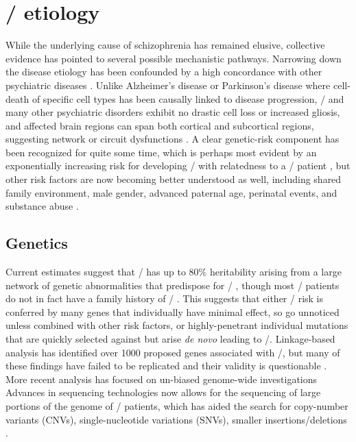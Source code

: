 \section{\Scz/ etiology}\label{sec:intro:scz:etiology}
While the underlying cause of schizophrenia has remained elusive, collective evidence has pointed to several possible mechanistic pathways.
Narrowing down the disease etiology has been confounded by a high concordance with other psychiatric diseases \citep{Kessler2005}.
Unlike Alzheimer’s disease or Parkinson’s disease where cell-death of specific cell types has been causally linked to disease progression, \scz/ and many other psychiatric disorders exhibit no drastic cell loss or increased gliosis, and affected brain regions can span both cortical and subcortical regions, suggesting network or circuit dysfunctions \citep{Uhlhaas2012, Lewis2002}.
A clear genetic-risk component has been recognized for quite some time, which is perhaps most evident by an exponentially increasing risk for developing \scz/ with relatedness to a \scz/ patient \citep{Rodriguez-Murillo2012}, but other risk factors are now becoming better understood as well, including shared family environment, male gender, advanced paternal age, perinatal events, and substance abuse \citep{Lichtenstein2009}.

\subsection{Genetics}
Current estimates suggest that \scz/ has up to 80\% heritability arising from a large network of genetic abnormalities that predispose for \scz/ \citep{Ripke2011}, though most \scz/ patients do not in fact have a family history of \scz/ \citep{Rodriguez-Murillo2012}.
This suggests that either \scz/ risk is conferred by many genes that individually have minimal effect, so go unnoticed unless combined with other risk factors, or highly-penetrant individual mutations that are quickly selected against but arise \emph{de novo} leading to \scz/.
Linkage-based analysis has identified over 1000 proposed genes associated with \scz/, but many of these findings have failed to be replicated and their validity is questionable \citep[\url{http://www.szgene.org}, ][]{Allen2008}.
More recent analysis has focused on un-biased genome-wide investigations
Advances in sequencing technologies now allows for the sequencing of large portions of the genome of \scz/ patients, which has aided the search for copy-number variants (CNVs), single-nucleotide variations (SNVs), smaller insertions/deletions \citep{Rodriguez-Murillo2012}.

